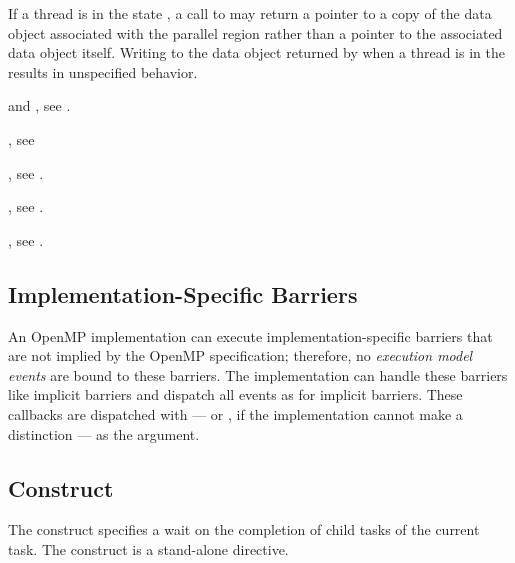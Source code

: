 \restrictions

If a thread is in the state , 
a call to  may return a pointer to a copy of the 
data object associated with the parallel region rather than a pointer to 
the associated data object itself. Writing to the data object 
returned by  when a thread is in the 
 results in unspecified behavior.

\begin{crossrefs}

\item {} and , see
  .

\item {}, see

\item {}, see
  .

\item {}, see
  .

\item {}, see
  .
\end{crossrefs}



\subsection{Implementation-Specific Barriers}
\label{subsec:implementation-specific-barrier}

An OpenMP implementation can execute implementation-specific barriers 
that are not implied by the OpenMP specification; therefore, no 
\emph{execution model events} are bound to these barriers. The 
implementation can handle these barriers like implicit barriers and
dispatch all events as for implicit barriers. These callbacks 
are dispatched with  --- or
, if the implementation cannot make a
distinction --- as the  argument.



\subsection{ Construct}
\label{subsec:taskwait Construct}
\summary
The  construct specifies a wait on the completion of child tasks
of the current task. The  construct is a stand-alone directive.

